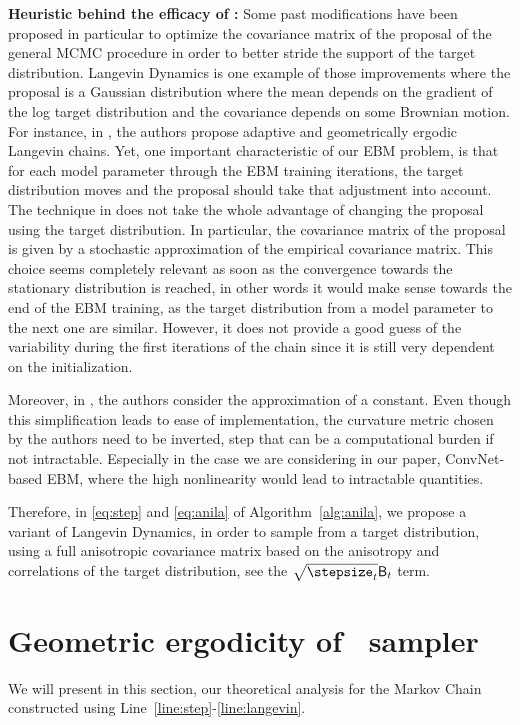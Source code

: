 \documentclass[10pt,twocolumn,letterpaper]{article}
\begin{document}
\textbf{Heuristic behind the efficacy of \algo:}
Some past modifications have been proposed in particular to optimize the covariance matrix of the proposal of the general MCMC procedure in order to better stride the support of the target distribution. 
Langevin Dynamics is one example of those improvements where the proposal is a Gaussian distribution where the mean depends on the gradient of the log target distribution and the covariance depends on some Brownian motion.
For instance, in \cite{atchade2006adaptive,marshall2012adaptive}, the authors propose adaptive and geometrically ergodic Langevin chains. 
Yet, one important characteristic of our EBM problem, is that for each model parameter through the EBM training iterations, the target distribution moves and the proposal should take that adjustment into account.
The technique in \cite{atchade2006adaptive,marshall2012adaptive} does not take the whole advantage of changing the proposal using the target distribution. 
In particular, the covariance matrix of the proposal is given by a stochastic approximation of the empirical covariance matrix. 
This choice seems completely relevant as soon as the convergence towards the stationary distribution is reached, in other words it would make sense towards the end of the EBM training, as the target distribution from a model parameter to the next one are similar. 
However, it does not provide a good guess of the variability during the first iterations of the chain since it is still very dependent on the initialization. 

Moreover, in  \cite{girolami2011riemann}, the authors consider the approximation of a constant. Even though this simplification leads to ease of implementation, the curvature metric chosen by the authors need to be inverted, step that can be a computational burden if not intractable. 
Especially in the case we are considering in our paper, \ie ConvNet-based EBM, where the high nonlinearity would lead to intractable quantities.

Therefore, in \eqref{eq:step} and \eqref{eq:anila} of Algorithm~\ref{alg:anila}, we propose a variant of Langevin Dynamics, in order to sample from a target distribution, using a full anisotropic covariance matrix based on the anisotropy and correlations of the target distribution, see the $\sqrt{\stepsize_t} \mathsf{B}_t$ term. 


\section{Geometric ergodicity of \algo\ sampler}\label{sec:theory}
We will present in this section, our theoretical analysis for the Markov Chain constructed using Line~\ref{line:step}-\ref{line:langevin}. 
\end{document}
